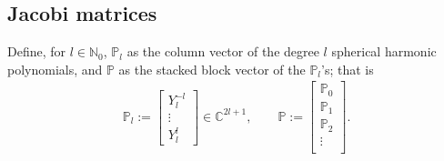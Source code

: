 \documentclass[11pt, oneside]{article}   	%
\newcommand{\C}{\mathbb{C}}
\newcommand{\No}{\mathbb{N}_0}
\newcommand{\bigP}{\mathbb{P}}
\newcommand{\Pl}{\mathbb{P}_l}
\begin{document}
\subsection{Jacobi matrices}

Define, for \(l \in \No\), \(\Pl\) as the column vector of the degree \(l\) spherical harmonic polynomials, and \(\bigP\) as the stacked block vector of the \(\Pl\)'s; that is
\begin{align}
\Pl := \begin{bmatrix}
		Y^{-l}_l \\
		\vdots \\
		Y^l_l
	\end{bmatrix} \in \C^{2l+1}, 
\quad \quad 
\bigP := \begin{bmatrix}
		\bigP_0 \\
		\hline
		\bigP_1 \\
		\hline
		\bigP_2 \\
		\vdots \\
	\end{bmatrix}.
\end{align}
\end{document}

